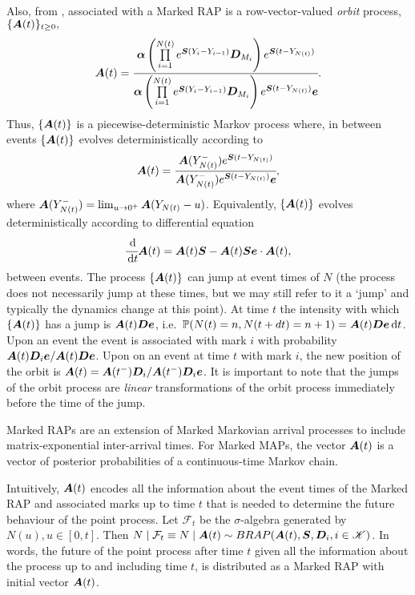 Also, from \cite{bn2010}, associated with a Marked RAP is a row-vector-valued \emph{orbit} process, \(\{\boldsymbol A(t)\}_{t\geq0},\)
\[\boldsymbol A(t) = \cfrac{\boldsymbol \alpha\left( \prod\limits_{i=1}^{N(t)} e^{\boldsymbol S(Y_{i}-Y_{i-1})}\boldsymbol D_{M_i}\right)e^{\boldsymbol S (t-Y_{N(t)})}}{\boldsymbol \alpha\left( \prod\limits_{i=1}^{N(t)} e^{\boldsymbol S(Y_{i}-Y_{i-1})}\boldsymbol D_{M_i}\right)e^{\boldsymbol S( t-Y_{N(t)})}\boldsymbol e}.\]
Thus, \(\{\boldsymbol A(t)\}\) is a piecewise-deterministic Markov process where, in between events \(\{\boldsymbol A(t)\}\) evolves deterministically according to 
\[\boldsymbol A(t) = \cfrac{\boldsymbol A(Y_{N(t)}^-)e^{\boldsymbol S(t-Y_{N(t)})}}{\boldsymbol A(Y_{N(t)}^-)e^{\boldsymbol S(t-Y_{N(t)})}\boldsymbol e},\]
where \(\boldsymbol A(Y_{N(t)}^-) = \lim_{u\to 0^+}\boldsymbol A(Y_{N(t)}-u)\). Equivalently, \(\{\boldsymbol A(t)\}\) evolves deterministically according to differential equation
\[\cfrac{\, \mathrm{d}}{\, \mathrm{d} t} \boldsymbol A(t) = \boldsymbol A(t)\boldsymbol S - \boldsymbol A(t)\boldsymbol S\boldsymbol e\cdot \boldsymbol A(t),\] 
between events. 
The process \(\{\boldsymbol A(t)\}\) can jump at event times of \(N\) (the process does not necessarily jump at these times, but we may still refer to it a `jump' and typically the dynamics change at this point). At time \(t\) the intensity with which \(\{\boldsymbol A(t)\}\) has a jump is \(\boldsymbol A(t) \boldsymbol D\boldsymbol e\), i.e.~\(\mathbb P(N(t)=n,N(t+dt)=n+1)=\boldsymbol A(t) \boldsymbol D\boldsymbol e\, \mathrm{d} t\). Upon an event the event is associated with mark \(i\) with probability \(\boldsymbol A(t) \boldsymbol D_i\boldsymbol e/\boldsymbol A(t) \boldsymbol D\boldsymbol e\). Upon on an event at time \(t\) with mark \(i\), the new position of the orbit is \(\boldsymbol A(t) = \boldsymbol A(t^-) \boldsymbol D_i/\boldsymbol A(t^-) \boldsymbol D_i\boldsymbol e\). It is important to note that the jumps of the orbit process are \emph{linear} transformations of the orbit process immediately before the time of the jump. 

Marked RAPs are an extension of Marked Markovian arrival processes to include matrix-exponential inter-arrival times. For Marked MAPs, the vector \(\boldsymbol A(t)\) is a vector of posterior probabilities of a continuous-time Markov chain. 

Intuitively, \(\boldsymbol A(t)\) encodes all the information about the event times of the Marked RAP and associated marks up to time \(t\) that is needed to determine the future behaviour of the point process. Let \(\mathcal F_{t}\) be the \(\sigma\)-algebra generated by \(N(u), u\in[0,t]\). Then \(N\mid \mathcal F_t \equiv N\mid \boldsymbol A(t) \sim BRAP(\boldsymbol A(t), \boldsymbol S, \boldsymbol D_i,i\in\mathscr K)\). In words, the future of the point process after time \(t\) given all the information about the process up to and including time \(t\), is distributed as a Marked RAP with initial vector \(\boldsymbol A(t)\). 

